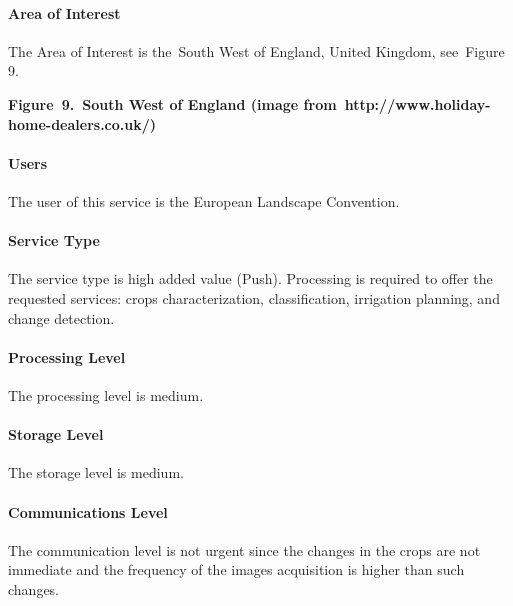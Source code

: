 \documentclass[a4paper]{article}
\begin{document}
\paragraph[Area of Interest\ ]{ Area of
Interest\ }
\foreignlanguage{english}{The Area of Interest is the\ }South West of
England, United Kingdom, see\ Figure 9.


\bigskip

{%
 \par}

{\centering\bfseries
\label{bkm:Ref377547646}Figure\ 9.\ South West of England (image
from\ http://www.holiday-home-dealers.co.uk/)
\par}

\paragraph[Users]{ Users}
The user of this service is the European Landscape Convention.

\paragraph[Service Type]{ Service Type}
{
The service type is high added value (Push). Processing is required to
offer the requested services: crops characterization, classification,
irrigation planning, and change detection.}

\paragraph[Processing Level]{ Processing Level}
{
The processing level is medium.}

\paragraph[Storage Level]{ Storage Level}
{
The storage level is medium.}

\paragraph[Communications Level]{ Communications
Level}
{
The communication level is not urgent since the changes in the crops are
not immediate and the frequency of the images acquisition is higher
than such changes.\ }
\end{document}
